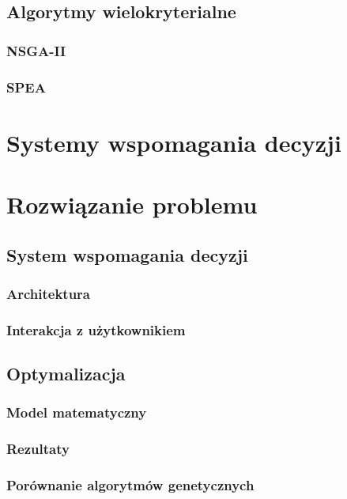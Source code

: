 \documentclass[twoside]{iisthesis}
\begin{document}
\section{Algorytmy wielokryterialne}
\subsection{NSGA-II}
\subsection{SPEA}

\chapter{Systemy wspomagania decyzji}

\chapter{Rozwiązanie problemu}
\section{System wspomagania decyzji}
\subsection{Architektura}
\subsection{Interakcja z użytkownikiem}
\section{Optymalizacja}
\subsection{Model matematyczny}
\subsection{Rezultaty}
\subsection{Porównanie algorytmów genetycznych}
\end{document}
